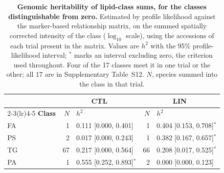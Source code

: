 \documentclass[9pt,twocolumn,twoside]{rilabRxiv}
\begin{document}
\begin{table}[!ht]
\centering
\caption{\textbf{Genomic heritability of lipid-class sums, for the classes
distinguishable from zero.} Estimated by profile likelihood against the
marker-based relationship matrix, on the summed spatially corrected intensity of
the class ($\log_{10}$ scale), using the accessions of each trial present in the
matrix. Values are $h^2$ with the 95\% profile-likelihood
interval; $^{*}$ marks an interval excluding zero, the criterion used throughout.
Four of the 17 classes meet it in one trial or the other; all 17 are in
Supplementary Table~S12. $N$, species summed into the class in that trial.}
\label{tab:classsum_h2}
\small
\begin{tabular}{lrlrl}
\toprule
 & \multicolumn{2}{c}{\textbf{CTL}} & \multicolumn{2}{c}{\textbf{LIN}} \\
\cmidrule(lr){2-3}\cmidrule(lr){4-5}
\textbf{Class} & \textbf{$N$} & \textbf{$h^2$} & \textbf{$N$} & \textbf{$h^2$} \\
\midrule
FA & 1 & 0.111 [0.000, 0.401] & 1 & 0.404 [0.153, 0.708]$^{*}$ \\
PS & 2 & 0.017 [0.000, 0.243] & 1 & 0.382 [0.167, 0.657]$^{*}$ \\
TG & 67 & 0.217 [0.000, 0.564] & 66 & 0.208 [0.017, 0.525]$^{*}$ \\
PA & 1 & 0.555 [0.252, 0.893]$^{*}$ & 2 & 0.000 [0.000, 0.123] \\
\bottomrule
\end{tabular}
\end{table}
\end{document}
